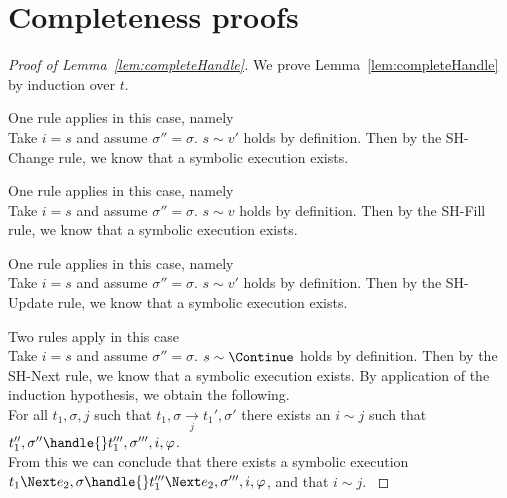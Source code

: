 

\section{Completeness proofs}
\label{sec:completeness-proofs}


%

\begin{proof}[Proof of Lemma~\ref{lem:completeHandle}]

  We prove Lemma~\ref{lem:completeHandle} by induction over $t$.\\

  {One rule applies in this case, namely \\
  Take $i=s$ and assume $\sigma''=\sigma$. $s\sim v'$ holds by definition.
  Then by the SH-Change rule, we know that a symbolic execution exists.

  }

  {One rule applies in this case, namely \\
  Take $i=s$ and assume $\sigma''=\sigma$. $s\sim v$ holds by definition.
  Then by the SH-Fill rule,
  we know that a symbolic execution exists.
  }

  {One rule applies in this case, namely \\
  Take $i=s$ and assume $\sigma''=\sigma$. $s\sim v'$ holds by definition.
  Then by the SH-Update rule,
  we know that a symbolic execution exists.
   }

  {Two rules apply in this case\\
    {
    Take $i=s$ and assume $\sigma''=\sigma$. $s\sim \Continue$ holds by definition.
    Then by the SH-Next rule, we know that a symbolic execution exists.
    }
    {
    By application of the induction hypothesis, we obtain the following.\\
    For all $t_1,\sigma,j$ such that $t_1,\sigma\xrightarrow[j]{}t_1',\sigma'$ there exists an $i\sim j$ such that $t_1'',\sigma''\handle{}t_1''',\sigma''',i,\phi$.\\
    From this we can conclude that there exists a symbolic execution $t_1\Next e_2,\sigma\handle{} t_1'''\Next e_2,\sigma''',i,\phi$, and that $i\sim j$.
    }
  }



\end{proof}
